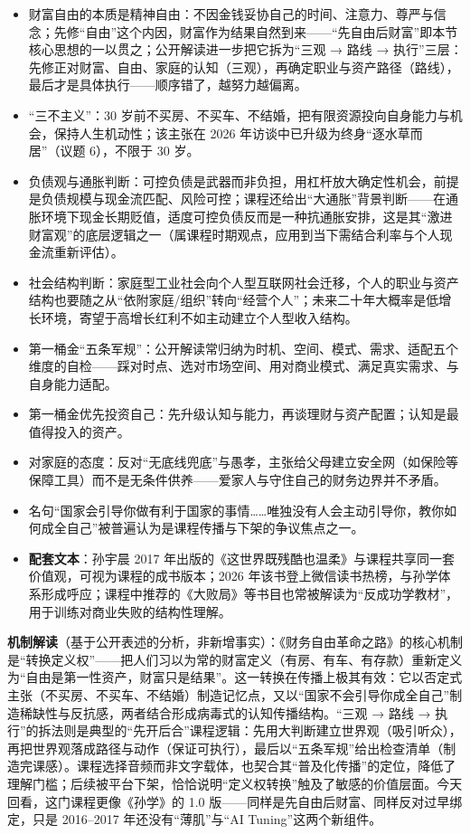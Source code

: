 \begin{itemize}
\item
  财富自由的本质是精神自由：不因金钱妥协自己的时间、注意力、尊严与信念；先修``自由''这个内因，财富作为结果自然到来------``先自由后财富''即本节核心思想的一以贯之；公开解读进一步把它拆为``三观
  → 路线 →
  执行''三层：先修正对财富、自由、家庭的认知（三观），再确定职业与资产路径（路线），最后才是具体执行------顺序错了，越努力越偏离。
\item
  ``三不主义''：30
  岁前不买房、不买车、不结婚，把有限资源投向自身能力与机会，保持人生机动性；该主张在
  2026 年访谈中已升级为终身``逐水草而居''（议题 6），不限于 30 岁。
\item
  负债观与通胀判断：可控负债是武器而非负担，用杠杆放大确定性机会，前提是负债规模与现金流匹配、风险可控；课程还给出``大通胀''背景判断------在通胀环境下现金长期贬值，适度可控负债反而是一种抗通胀安排，这是其``激进财富观''的底层逻辑之一（属课程时期观点，应用到当下需结合利率与个人现金流重新评估）。
\item
  社会结构判断：家庭型工业社会向个人型互联网社会迁移，个人的职业与资产结构也要随之从``依附家庭/组织''转向``经营个人''；未来二十年大概率是低增长环境，寄望于高增长红利不如主动建立个人型收入结构。
\item
  第一桶金``五条军规''：公开解读常归纳为时机、空间、模式、需求、适配五个维度的自检------踩对时点、选对市场空间、用对商业模式、满足真实需求、与自身能力适配。
\item
  第一桶金优先投资自己：先升级认知与能力，再谈理财与资产配置；认知是最值得投入的资产。
\item
  对家庭的态度：反对``无底线兜底''与愚孝，主张给父母建立安全网（如保险等保障工具）而不是无条件供养------爱家人与守住自己的财务边界并不矛盾。
\item
  名句``国家会引导你做有利于国家的事情\ldots\ldots 唯独没有人会主动引导你，教你如何成全自己''被普遍认为是课程传播与下架的争议焦点之一。
\item
  \textbf{配套文本}：孙宇晨 2017
  年出版的《这世界既残酷也温柔》与课程共享同一套价值观，可视为课程的成书版本；2026
  年该书登上微信读书热榜，与孙学体系形成呼应；课程中推荐的《大败局》等书目也常被解读为``反成功学教材''，用于训练对商业失败的结构性理解。
\end{itemize}

\textbf{机制解读}（基于公开表述的分析，非新增事实）：《财务自由革命之路》的核心机制是``转换定义权''------把人们习以为常的财富定义（有房、有车、有存款）重新定义为``自由是第一性资产，财富只是结果''。这一转换在传播上极其有效：它以否定式主张（不买房、不买车、不结婚）制造记忆点，又以``国家不会引导你成全自己''制造稀缺性与反抗感，两者结合形成病毒式的认知传播结构。``三观
→ 路线 →
执行''的拆法则是典型的``先开后合''课程逻辑：先用大判断建立世界观（吸引听众），再把世界观落成路径与动作（保证可执行），最后以``五条军规''给出检查清单（制造完课感）。课程选择音频而非文字载体，也契合其``普及化传播''的定位，降低了理解门槛；后续被平台下架，恰恰说明``定义权转换''触及了敏感的价值层面。今天回看，这门课程更像《孙学》的
1.0 版------同样是先自由后财富、同样反对过早绑定，只是 2016--2017
年还没有``薄肌''与``AI Tuning''这两个新组件。

